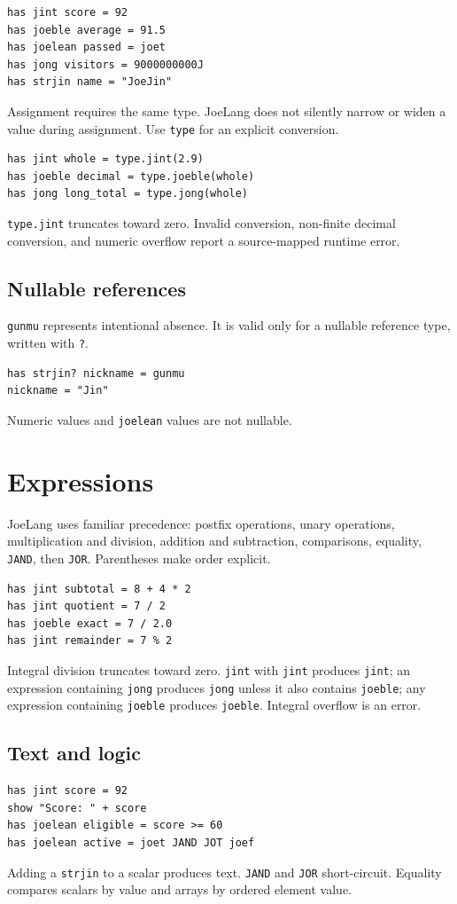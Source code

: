 \documentclass[11pt]{article}
\newcommand{\keyword}[1]{\texttt{#1}}
\begin{document}
\begin{lstlisting}
has jint score = 92
has joeble average = 91.5
has joelean passed = joet
has jong visitors = 9000000000J
has strjin name = "JoeJin"
\end{lstlisting}

Assignment requires the same type. JoeLang does not silently narrow or widen a value during assignment. Use \keyword{type} for an explicit conversion.

\begin{lstlisting}
has jint whole = type.jint(2.9)
has joeble decimal = type.joeble(whole)
has jong long_total = type.jong(whole)
\end{lstlisting}

\keyword{type.jint} truncates toward zero. Invalid conversion, non-finite decimal conversion, and numeric overflow report a source-mapped runtime error.

\subsection{Nullable references}
\keyword{gunmu} represents intentional absence. It is valid only for a nullable reference type, written with \keyword{?}.
\begin{lstlisting}
has strjin? nickname = gunmu
nickname = "Jin"
\end{lstlisting}
Numeric values and \keyword{joelean} values are not nullable.

\section{Expressions}
JoeLang uses familiar precedence: postfix operations, unary operations, multiplication and division, addition and subtraction, comparisons, equality, \keyword{JAND}, then \keyword{JOR}. Parentheses make order explicit.

\begin{lstlisting}
has jint subtotal = 8 + 4 * 2
has jint quotient = 7 / 2
has joeble exact = 7 / 2.0
has jint remainder = 7 % 2
\end{lstlisting}

Integral division truncates toward zero. \keyword{jint} with \keyword{jint} produces \keyword{jint}; an expression containing \keyword{jong} produces \keyword{jong} unless it also contains \keyword{joeble}; any expression containing \keyword{joeble} produces \keyword{joeble}. Integral overflow is an error.

\subsection{Text and logic}
\begin{lstlisting}
has jint score = 92
show "Score: " + score
has joelean eligible = score >= 60
has joelean active = joet JAND JOT joef
\end{lstlisting}
Adding a \keyword{strjin} to a scalar produces text. \keyword{JAND} and \keyword{JOR} short-circuit. Equality compares scalars by value and arrays by ordered element value.
\end{document}
